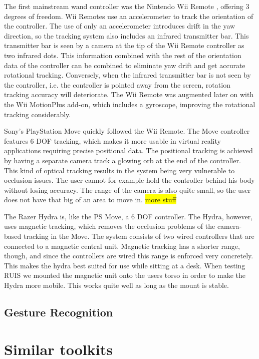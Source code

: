 \documentclass[12pt,a4paper,oneside,pdftex]{report}
\begin{document}
The first mainstream wand controller was the Nintendo Wii Remote \cite{WiiRemoteMain}, offering 3 degrees of freedom. Wii Remotes use an accelerometer to track the orientation of the controller. The use of only an accelerometer introduces drift in the yaw direction, so the tracking system also includes an infrared transmitter bar. This transmitter bar is seen by a camera at the tip of the Wii Remote controller as two infrared dots. This information combined with the rest of the orientation data of the controller can be combined to eliminate yaw drift and get accurate rotational tracking. Conversely, when the infrared transmitter bar is not seen by the controller, i.e. the controller is pointed away from the screen, rotation tracking accuracy will deteriorate. The Wii Remote was augmented later on with the Wii MotionPlus add-on, which includes a gyroscope, improving the rotational tracking considerably. 

Sony's PlayStation Move \cite{PSMoveMain} quickly followed the Wii Remote. The Move controller features 6 DOF tracking, which makes it more usable in virtual reality applications requiring precise positional data. The positional tracking is achieved by having a separate camera track a glowing orb at the end of the controller. This kind of optical tracking results in the system being very vulnerable to occlusion issues. The user cannot for example hold the controller behind his body without losing accuracy. The range of the camera is also quite small, so the user does not have that big of an area to move in. \hl{more stuff}

The Razer Hydra is, like the PS Move, a 6 DOF controller. The Hydra, however, uses magnetic tracking, which removes the occlusion problems of the camera-based tracking in the Move. The system consists of two wired controllers that are connected to a magnetic central unit. Magnetic tracking has a shorter range, though, and since the controllers are wired this range is enforced very concretely. This makes the hydra best suited for use while sitting at a desk. When testing RUIS we mounted the magnetic unit onto the users torso in order to make the Hydra more mobile. This works quite well as long as the mount is stable. 

\subsection{Gesture Recognition}
\label{subsection:motion:gesture}

\section{Similar toolkits}
\label{section:similar}
\end{document}

